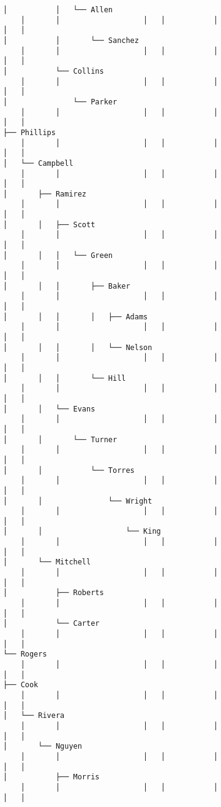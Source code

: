 \documentclass[11pt]{article}
\begin{document}
\begin{Verbatim}[commandchars=\\\{\}]
│           │   └── Allen
    │       │                   │   │           │                       │   │
│           │       └── Sanchez
    │       │                   │   │           │                       │   │
│           └── Collins
    │       │                   │   │           │                       │   │
│               └── Parker
    │       │                   │   │           │                       │   │
├── Phillips
    │       │                   │   │           │                       │   │
│   └── Campbell
    │       │                   │   │           │                       │   │
│       ├── Ramirez
    │       │                   │   │           │                       │   │
│       │   ├── Scott
    │       │                   │   │           │                       │   │
│       │   │   └── Green
    │       │                   │   │           │                       │   │
│       │   │       ├── Baker
    │       │                   │   │           │                       │   │
│       │   │       │   ├── Adams
    │       │                   │   │           │                       │   │
│       │   │       │   └── Nelson
    │       │                   │   │           │                       │   │
│       │   │       └── Hill
    │       │                   │   │           │                       │   │
│       │   └── Evans
    │       │                   │   │           │                       │   │
│       │       └── Turner
    │       │                   │   │           │                       │   │
│       │           └── Torres
    │       │                   │   │           │                       │   │
│       │               └── Wright
    │       │                   │   │           │                       │   │
│       │                   └── King
    │       │                   │   │           │                       │   │
│       └── Mitchell
    │       │                   │   │           │                       │   │
│           ├── Roberts
    │       │                   │   │           │                       │   │
│           └── Carter
    │       │                   │   │           │                       │   │
└── Rogers
    │       │                   │   │           │                       │   │
├── Cook
    │       │                   │   │           │                       │   │
│   └── Rivera
    │       │                   │   │           │                       │   │
│       └── Nguyen
    │       │                   │   │           │                       │   │
│           ├── Morris
    │       │                   │   │           │                       │   │

\end{Verbatim}
\end{document}
